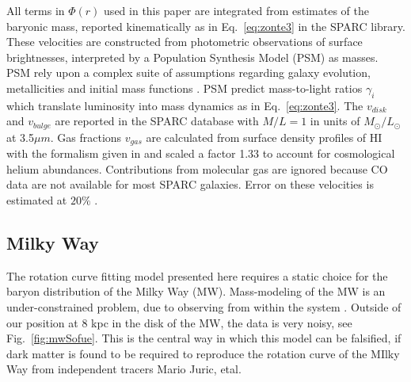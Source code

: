\documentclass[reprint,%
 amsmath,amssymb,
 aps,
]{revtex4-1}
\begin{document}
   
     All terms in $\Phi(r)$ used in this paper  are    integrated from estimates of the baryonic mass, reported kinematically as in Eq.~\ref{eq:zonte3} in the      SPARC  library.   These velocities  are constructed from photometric observations of surface brightnesses, interpreted   by a Population Synthesis Model (PSM)\cite{10.1093/mnras/sty3223} as     masses. 
PSM rely upon a complex  suite of  assumptions regarding galaxy evolution, metallicities and initial mass functions  \cite{BelldYong,10.1093/mnras/sty3223}. PSM predict   mass-to-light ratios  $\gamma_i$
 which translate  luminosity into mass dynamics as in Eq.~\ref{eq:zonte3}. 
     The $v_{disk}$ and $v_{bulge}$ are reported in the SPARC database with $ M/L = 1$ in units of  $M_{\odot} / L_{\odot}$   at 3.5$\mu m$.
     Gas fractions $v_{gas}$ are calculated from surface density profiles of HI  with the formalism given in  \cite{1983MNRAS.203..735C} and scaled 
     a factor 1.33 to account for cosmological helium abundances.  
     Contributions from molecular gas are ignored   because CO data are not available for most SPARC galaxies. 
     Error on these velocities is estimated at $20\%$ \cite{2016Lelli}. 
     
      
  
 

  
 


\subsection{Milky Way}
The rotation curve fitting model presented here requires a static choice for the baryon distribution of the   Milky Way (MW).   Mass-modeling of the MW is an under-constrained problem, due to     observing from       within  the system  \cite{1991ARA&A..29..409F}.
 Outside of our position at 8 kpc in the disk of the MW, the data is very 
 noisy, see  Fig.~\ref{fig:mwSofue}. This is the central way in which this model can be falsified, if dark matter is found to be required to reproduce the rotation curve of the MIlky Way from independent tracers Mario Juric, etal. 
 
\end{document}

